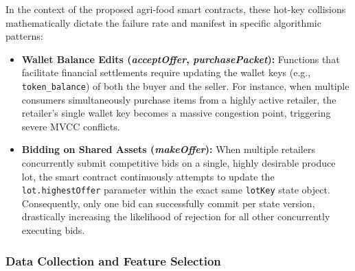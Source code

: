 \documentclass[manuscript,screen,nofonts]{acmart}
\begin{document}
  In the context of the proposed agri-food smart contracts, these hot-key collisions mathematically dictate the failure rate and manifest in specific algorithmic patterns:
  \begin{itemize}
      \item \textbf{Wallet Balance Edits (\textit{acceptOffer}, \textit{purchasePacket}):} Functions that facilitate financial settlements require updating the wallet keys (e.g., \texttt{token\_balance}) of both the buyer and the seller. For instance, when multiple consumers simultaneously purchase items from a highly active retailer, the retailer's single wallet key becomes a massive congestion point, triggering severe MVCC conflicts.
      \item \textbf{Bidding on Shared Assets (\textit{makeOffer}):} When multiple retailers concurrently submit competitive bids on a single, highly desirable produce lot, the smart contract continuously attempts to update the \texttt{lot.highestOffer} parameter within the exact same \texttt{lotKey} state object. Consequently, only one bid can successfully commit per state version, drastically increasing the likelihood of rejection for all other concurrently executing bids.
  \end{itemize}
   
  
  \subsubsection{Data Collection and Feature Selection}
\end{document}
